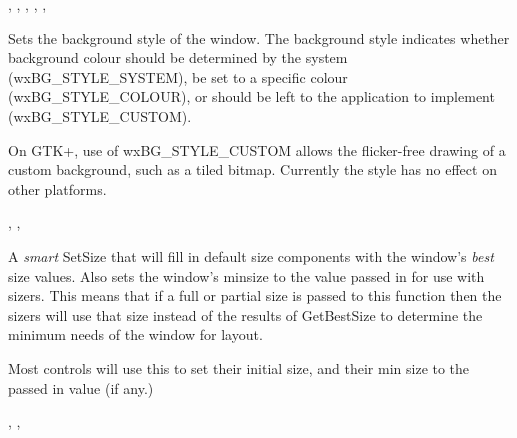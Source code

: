 
,\rtfsp
{},\rtfsp
{},\rtfsp
{},\rtfsp
{},\rtfsp
{}

\label{wxwindowsetbackgroundstyle}


Sets the background style of the window. The background style indicates
whether background colour should be determined by the system (wxBG\_STYLE\_SYSTEM),
be set to a specific colour (wxBG\_STYLE\_COLOUR), or should be left to the
application to implement (wxBG\_STYLE\_CUSTOM).

On GTK+, use of wxBG\_STYLE\_CUSTOM allows the flicker-free drawing of a custom
background, such as a tiled bitmap. Currently the style has no effect on other platforms.


,\rtfsp
{},\rtfsp
{}


\label{wxwindowsetinitialsize}


A {\it smart} SetSize that will fill in default size components with the
window's {\it best} size values.  Also sets the window's minsize to
the value passed in for use with sizers.  This means that if a full or
partial size is passed to this function then the sizers will use that
size instead of the results of GetBestSize to determine the minimum
needs of the window for layout.

Most controls will use this to set their initial size, and their min
size to the passed in value (if any.)



,\rtfsp
{},\rtfsp
{}


